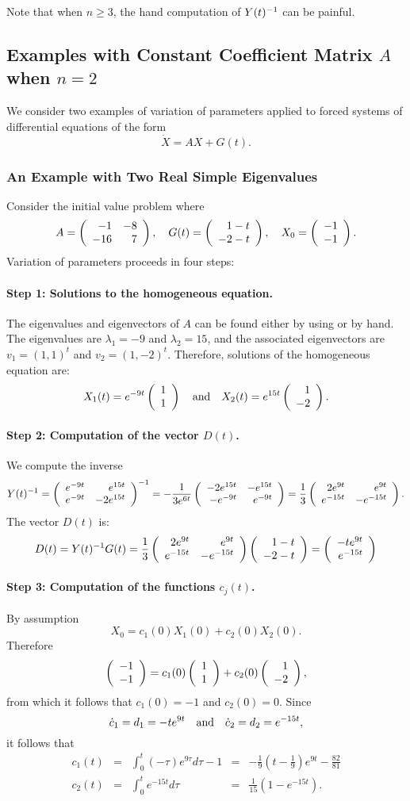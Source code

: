 \documentclass{ximera}
\begin{document}
Note that when $n\ge 3$, the hand computation of $Y(t)^{-1}$ can be  
painful.

\subsection*{Examples with Constant Coefficient Matrix $A$ when $n=2$}

We consider two examples of variation of parameters applied to 
forced systems of differential equations of the form 
\[
\dot{X} = AX + G(t).
\]

\subsubsection*{An Example with Two Real Simple Eigenvalues}

Consider the initial value problem  where
\begin{equation}  \label{eq:exinhom2}
A=\left(\begin{array}{rr} -1 & -8\\ -16 &7\end{array}\right), \quad G(t)= \left(\begin{array}{r} 1-t \\ -2-t\end{array}\right), \quad 
X_0 =  \left(\begin{array}{r} -1 \\ -1\end{array}\right).
\end{equation}
Variation of parameters proceeds in four steps:

\paragraph{Step 1: Solutions to the homogeneous equation.} The 
eigenvalues and 
eigenvectors of $A$ can be 
found either by using \Matlab or by hand.  The eigenvalues are $\lambda_1=-9$ 
and $\lambda_2=15$, and the associated eigenvectors are $v_1=(1,1)^t$ 
and $v_2=(1,-2)^t$.  Therefore, solutions of the homogeneous equation are:
\[
X_1(t) = e^{-9t}\left(\begin{array}{r} 1 \\ 1\end{array}\right) \quad\mbox{and}\quad X_2(t) = e^{15t}\left(\begin{array}{r} 1 \\ -2\end{array}\right).
\]

\paragraph{Step 2: Computation of the vector $D(t)$.}   We compute the inverse 
\[
Y(t)^{-1} = \left(\begin{array}{rr} e^{-9t} & e^{15t}\\ e^{-9t} &-2e^{15t}\end{array}\right)^{-1} = 
-\frac{1}{3e^{6t}}\left(\begin{array}{rr} -2e^{15t} & -e^{15t}\\ -e^{-9t} &e^{-9t}\end{array}\right) =
\frac{1}{3}\left(\begin{array}{rr} 2e^{9t} & e^{9t}\\ e^{-15t} &-e^{-15t}\end{array}\right).
\]
The vector $D(t)$ is:
\[
D(t) = Y(t)^{-1} G(t) = 
\frac{1}{3}\left(\begin{array}{rr} 2e^{9t} & e^{9t}\\ e^{-15t} &-e^{-15t}\end{array}\right)\left(\begin{array}{r} 1-t \\ -2-t\end{array}\right)
= \left(\begin{array}{r} -te^{9t} \\ e^{-15t}\end{array}\right)
\]

\paragraph{Step 3: Computation of the functions $c_j(t)$.}   By assumption 
\[
X_0=c_1(0)X_1(0)+c_2(0)X_2(0).
\]
Therefore
\[
\left(\begin{array}{r} -1 \\ -1\end{array}\right) = c_1(0)\left(\begin{array}{r} 1 \\ 1\end{array}\right) + c_2(0)\left(\begin{array}{r} 1 \\ -2\end{array}\right),
\]
from which it follows that $c_1(0)=-1$ and $c_2(0)=0$.  Since
\[
\dot{c}_1 = d_1 = -te^{9t}  \quad\mbox{and}\quad \dot{c}_2 = d_2 = e^{-15t},
\]
it follows that 
\[
\begin{array}{rclcl}
c_1(t) & = & \int_0^t (-\tau) e^{9\tau}d\tau - 1
& = &  -\frac{1}{9}\left(t-\frac{1}{9}\right)e^{9t}-\frac{82}{81} \\
c_2(t) & = & \int_0^t e^{-15t}d\tau & = & \frac{1}{15}\left(1-e^{-15t}\right).
\end{array}
\]
\end{document}
